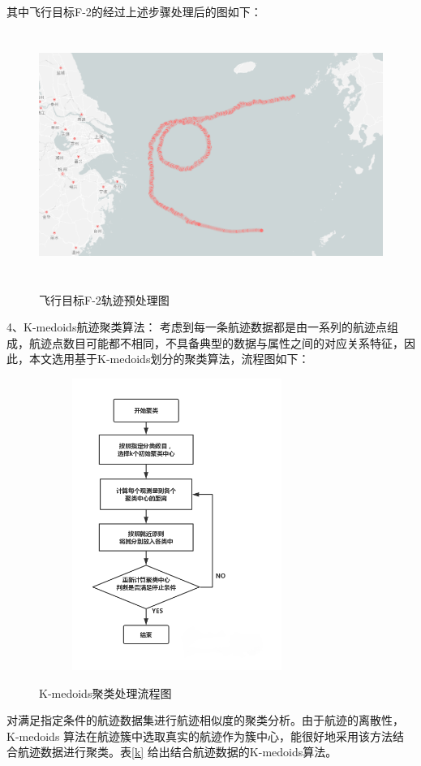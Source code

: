 \documentclass[GBK]{ctexart}
\begin{document}
\begin{spacing}{1.5}
其中飞行目标F-2的经过上述步骤处理后的图如下：
\begin{figure}[H]
  \centering
  \includegraphics[width=15cm,height=8cm]{20}\\
  \caption{飞行目标F-2轨迹预处理图}\label{20}
\end{figure}
4、K-medoids航迹聚类算法：
考虑到每一条航迹数据都是由一系列的航迹点组成，航迹点数目可能都不相同，不具备典型的数据与属性之间的对应关系特征，因此，本文选用基于K-medoids划分的聚类算法，流程图如下：
\begin{figure}[H]
  \centering
  \includegraphics[width=9cm,height=9.5cm]{liuk.png}\\
  \caption{K-medoids聚类处理流程图}\label{liuk}
\end{figure}
对满足指定条件的航迹数据集进行航迹相似度的聚类分析。由于航迹的离散性，K-medoids 算法在航迹簇中选取真实的航迹作为簇中心，能很好地采用该方法结合航迹数据进行聚类。表\ref{k} 给出结合航迹数据的K-medoids算法。

\end{spacing}
\end{document}
